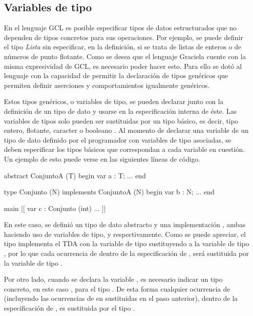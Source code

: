 {{\subsection{Variables de tipo}

En el lenguaje GCL es posible especificar tipos de datos estructurados que no
dependen de tipos concretos para sus operaciones. Por ejemplo, se puede definir
el tipo \textit{Lista} sin  especificar, en la definición, si se trata de listas
de enteros o de números de punto flotante. Como se desea que el lenguaje
Graciela cuente con la misma expresividad de GCL, es necesario poder hacer esto.
Para ello se dotó al lenguaje con la capacidad de permitir la declaración de
tipos genéricos que permiten definir aserciones y comportamientos igualmente
genéricos.

Estos tipos genéricos, o variables de tipo, se pueden declarar junto con la
definición de un tipo de dato y usarse en la especificación interna de éste. Las
variables de tipos solo pueden ser sustituidas por un tipo básico, es decir,
tipo entero, flotante, caracter o booleano . Al momento de
declarar una variable de un tipo de dato definido por el programador con
variables de tipo asociadas, se deben  especificar los tipos básicos que
correspondan a cada variable en cuestión. Un ejemplo de esto puede verse en las
siguientes líneas de código.

\begin{gracielacode}
abstract ConjuntoA (T) begin
  var a : T;
  ...
end

type Conjunto (N) implements ConjuntoA (N) begin
  var b : N;
  ...
end

main
 |[ var c : Conjunto (int)
    ...
 ]|
\end{gracielacode}

En este caso, se definió un tipo de dato abstracto  y una
implementación , ambas haciendo uso de variables de tipo,
 y  respectivamente. Como se puede apreciar, el tipo
 implementa el TDA  con la variable de tipo
 sustituyendo a la variable de tipo , por lo que cada
ocurrencia de  dentro de la especificación de , será
sustituida por la variable de tipo .

Por otro lado, cuando se declara la variable , es necesario indicar un
tipo concreto, en este caso , para el tipo . De
esta forma cualquier ocurrencia de  (incluyendo las ocurrencias de
 en  sustituidas en el paso anterior), dentro de la
especificación de , es sustituida por el tipo .

}}
